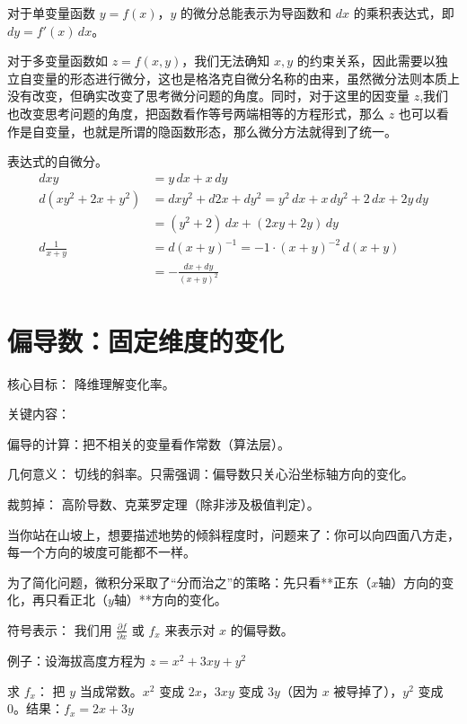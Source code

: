 对于单变量函数 $y = f(x)$，$y$ 的微分总能表示为导函数和 $dx$ 的乘积表达式，即 $dy = f'(x) \,dx$。

对于多变量函数如 $z = f(x, y)$，我们无法确知 $x, y$ 的约束关系，因此需要以独立自变量的形态进行微分，这也是格洛克自微分名称的由来，虽然微分法则本质上没有改变，但确实改变了思考微分问题的角度。同时，对于这里的因变量 $z$,我们也改变思考问题的角度，把函数看作等号两端相等的方程形式，那么 $z$ 也可以看作是自变量，也就是所谓的隐函数形态，那么微分方法就得到了统一。

\begin{example} 表达式的自微分。
    \begin{align*}
        dxy &= y \,dx + x \,dy \\
        d(xy^2 + 2x + y^2) &= dxy^2 + d2x + dy^2 = y^2 \,dx + x \,dy^2 + 2 \,dx + 2y \,dy \\
        &= (y^2 + 2) \,dx + (2xy + 2y) \,dy \\
        d\frac{1}{x + y} &= d(x + y)^{-1} = -1\cdot (x + y)^{-2} \,d(x + y) \\
        &= -\frac{dx + dy}{(x + y)^2}
    \end{align*}
\end{example}










\section{偏导数：固定维度的变化}

核心目标： 降维理解变化率。

关键内容：

偏导的计算：把不相关的变量看作常数（算法层）。

几何意义： 切线的斜率。只需强调：偏导数只关心沿坐标轴方向的变化。

裁剪掉： 高阶导数、克莱罗定理（除非涉及极值判定）。


当你站在山坡上，想要描述地势的倾斜程度时，问题来了：你可以向四面八方走，每一个方向的坡度可能都不一样。

为了简化问题，微积分采取了“分而治之”的策略：先只看**正东（$x$轴）方向的变化，再只看正北（$y$轴）**方向的变化。

符号表示： 我们用 $\frac{\partial f}{\partial x}$ 或 $f_x$ 来表示对 $x$ 的偏导数。

例子：设海拔高度方程为 $z = x^2 + 3xy + y^2$

求 $f_x$： 把 $y$ 当成常数。$x^2$ 变成 $2x$，$3xy$ 变成 $3y$（因为 $x$ 被导掉了），$y^2$ 变成 0。结果：$f_x = 2x + 3y$

